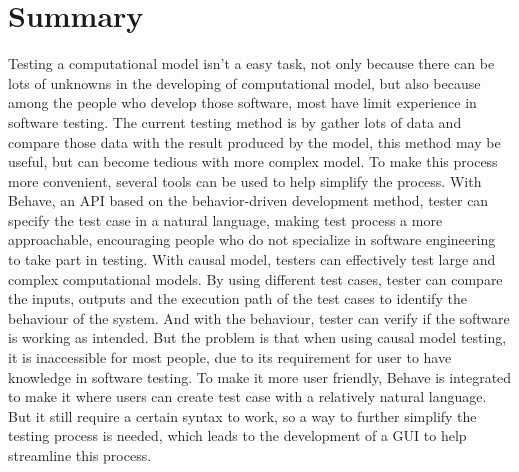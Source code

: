 \section{Summary}
Testing a computational model isn’t a easy task, not only because there can be lots of unknowns in the developing of computational model, but also because among the people who develop those software, most have limit experience in software testing. The current testing method is by gather lots of data and compare those data with the result produced by the model, this method may be useful, but can become tedious with more complex model. To make this process more convenient, several tools can be used to help simplify the process. With Behave, an API based on the behavior-driven development method, tester can specify the test case in a natural language, making test process a more approachable, encouraging people who do not specialize in software engineering to take part in testing. With causal model, testers can effectively test large and complex computational models. By using different test cases, tester can compare the inputs, outputs and the execution path of the test cases to identify the behaviour of the system. And with the behaviour, tester can verify if the software is working as intended. But the problem is that when using causal model testing, it is inaccessible for most people, due to its requirement for user to have knowledge in software testing. To make it more user friendly, Behave is integrated to make it where users can create test case with a relatively natural language. But it still require a certain syntax to work, so a way to further simplify the testing process is needed, which leads to the development of a GUI to help streamline this process.
